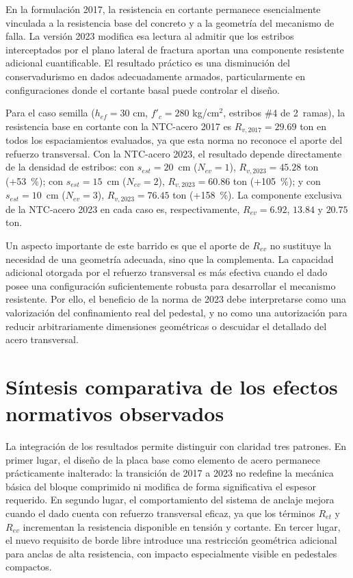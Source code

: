 En la formulación 2017, la resistencia en cortante permanece esencialmente vinculada a la
resistencia base del concreto y a la geometría del mecanismo de falla. La versión 2023 modifica esa
lectura al admitir que los estribos interceptados por el plano lateral de fractura aportan una
componente resistente adicional cuantificable. El resultado práctico es una disminución del
conservadurismo en dados adecuadamente armados, particularmente en configuraciones donde el cortante
basal puede controlar el diseño.

Para el caso semilla ($h_{ef}=30$ cm, $f'_c=280$ kg/cm$^2$, estribos \#4 de 2~ramas), la
resistencia base en cortante con la NTC-acero 2017 es $R_{v,2017}=29.69$ ton en todos los
espaciamientos evaluados, ya que esta norma no reconoce el aporte del refuerzo transversal. Con la
NTC-acero 2023, el resultado depende directamente de la densidad de estribos: con
$s_{est}=20$~cm ($N_{ev}=1$), $R_{v,2023}=45.28$ ton (+53~\%); con $s_{est}=15$~cm
($N_{ev}=2$), $R_{v,2023}=60.86$ ton (+105~\%); y con $s_{est}=10$~cm ($N_{ev}=3$),
$R_{v,2023}=76.45$ ton (+158~\%). La componente exclusiva de la NTC-acero 2023 en cada caso
es, respectivamente, $R_{ev}=6.92$, $13.84$ y $20.75$ ton.

Un aspecto importante de este barrido es que el aporte de $R_{ev}$ no sustituye la necesidad de una
geometría adecuada, sino que la complementa. La capacidad adicional otorgada por el refuerzo
transversal es más efectiva cuando el dado posee una configuración suficientemente robusta para
desarrollar el mecanismo resistente. Por ello, el beneficio de la norma de 2023 debe interpretarse
como una valorización del confinamiento real del pedestal, y no como una autorización para reducir
arbitrariamente dimensiones geométricas o descuidar el detallado del acero transversal.

\section{Síntesis comparativa de los efectos normativos observados}

La integración de los resultados permite distinguir con claridad tres patrones. En primer lugar, el
diseño de la placa base como elemento de acero permanece prácticamente inalterado: la transición de
2017 a 2023 no redefine la mecánica básica del bloque comprimido ni modifica de forma significativa
el espesor requerido. En segundo lugar, el comportamiento del sistema de anclaje mejora cuando el
dado cuenta con refuerzo transversal eficaz, ya que los términos $R_{et}$ y $R_{ev}$ incrementan la
resistencia disponible en tensión y cortante. En tercer lugar, el nuevo requisito de borde libre
introduce una restricción geométrica adicional para anclas de alta resistencia, con impacto
especialmente visible en pedestales compactos.


